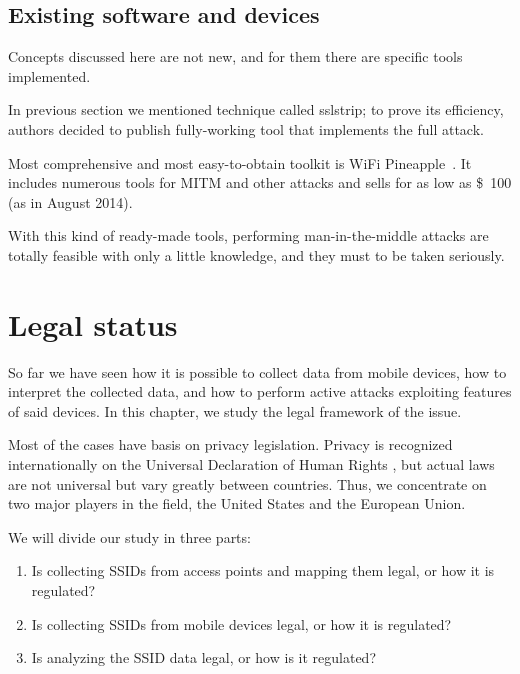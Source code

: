 \documentclass[12pt,a4paper,oneside,pdftex]{report}
\begin{document}
\section{Existing software and devices}

Concepts discussed here are not new, and for them there are specific tools implemented.

In previous section we mentioned technique called sslstrip; to prove its efficiency, authors decided to publish fully-working tool that implements the full attack.~\cite{marlinspike2009new}

Most comprehensive and most easy-to-obtain toolkit is WiFi Pineapple~\cite{wifipineapple}. It includes numerous tools for MITM and other attacks and sells for as low as \$~100 (as in August 2014).

With this kind of ready-made tools, performing man-in-the-middle attacks are totally feasible with only a little knowledge, and they must to be taken seriously.



\chapter{Legal status}
\label{chapter:legal}

So far we have seen how it is possible to collect data from mobile devices, how to interpret the collected data, and how to perform active attacks exploiting features of said devices. In this chapter, we study the legal framework of the issue.

Most of the cases have basis on privacy legislation. Privacy is recognized internationally on the Universal Declaration of Human Rights \cite{udhr}, but actual laws are not universal but vary greatly between countries. Thus, we concentrate on two major players in the field, the United States and the European Union.

We will divide our study in three parts:
\begin{enumerate}
    \item Is collecting SSIDs from access points and mapping them legal, or how it is regulated?
    \item Is collecting SSIDs from mobile devices legal, or how it is regulated?
    \item Is analyzing the SSID data legal, or how is it regulated?
\end{enumerate}
\end{document}
